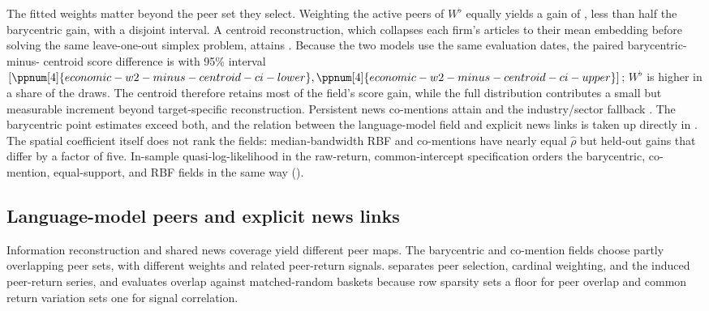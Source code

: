 The fitted weights matter beyond the peer set they select.
Weighting the active peers of $W^\flat$ equally yields a gain of
, less than half the
barycentric gain, with a disjoint interval.
A centroid reconstruction, which collapses each firm's articles to their mean
embedding before solving the same leave-one-out simplex problem, attains
.
Because the two models use the same evaluation dates, the paired
barycentric-minus-
centroid score difference is 
with 95\% interval
$[\ppnum[4]{economic-w2-minus-centroid-ci-lower},
\ppnum[4]{economic-w2-minus-centroid-ci-upper}]$; $W^\flat$ is higher in a share
 of the draws.
The centroid therefore retains most of the field's score gain, while the full
distribution contributes a small but measurable increment beyond
target-specific reconstruction.
Persistent news co-mentions attain 
and the industry/sector fallback
.
The barycentric point estimates exceed both, and the relation between the
language-model field and explicit news links is taken up directly in
.
The spatial coefficient itself does not rank the fields: median-bandwidth RBF
and co-mentions have nearly equal $\hat\rho$ but held-out gains that differ by
a factor of five.
In-sample quasi-log-likelihood in the raw-return, common-intercept
specification orders the barycentric, co-mention, equal-support, and RBF
fields in the same way ().

\subsection{Language-model peers and explicit news links}
\label{sec:field-overlap}

Information reconstruction and shared news coverage yield different peer
maps.
The barycentric and co-mention fields choose partly overlapping peer sets,
with different weights and related peer-return signals.
 separates peer selection, cardinal weighting, and the
induced peer-return series, and evaluates overlap against matched-random
baskets because row sparsity sets a floor for peer overlap and common return
variation sets one for signal correlation.

